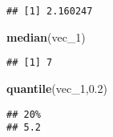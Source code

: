 \documentclass[
]{article}
\newenvironment{Shaded}{\begin{snugshade}}{\end{snugshade}}
\newcommand{\FloatTok}[1]{\textcolor[rgb]{0.00,0.00,0.81}{#1}}
\newcommand{\FunctionTok}[1]{\textcolor[rgb]{0.13,0.29,0.53}{\textbf{#1}}}
\newcommand{\NormalTok}[1]{#1}
\begin{document}
\begin{verbatim}
## [1] 2.160247
\end{verbatim}

\begin{Shaded}
\begin{Highlighting}[]
\FunctionTok{median}\NormalTok{(vec\_1)}
\end{Highlighting}
\end{Shaded}

\begin{verbatim}
## [1] 7
\end{verbatim}

\begin{Shaded}
\begin{Highlighting}[]
\FunctionTok{quantile}\NormalTok{(vec\_1,}\FloatTok{0.2}\NormalTok{)}
\end{Highlighting}
\end{Shaded}

\begin{verbatim}
## 20% 
## 5.2
\end{verbatim}
\end{document}
